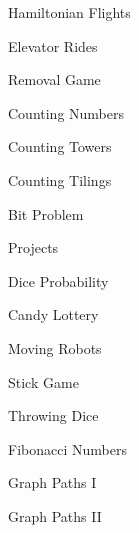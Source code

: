 \begin{practice}
\begin{pplist}
  \item Hamiltonian Flights
  \item Elevator Rides
  \item Removal Game
  \item Counting Numbers
  \item Counting Towers
  \item Counting Tilings
  \item Bit Problem
  \item Projects
\end{pplist}
\begin{pplist}
  \item Dice Probability
  \item Candy Lottery
  \item Moving Robots
  \item Stick Game
  \item Throwing Dice
  \item Fibonacci Numbers
  \item Graph Paths I
  \item Graph Paths II
\end{pplist}
\end{practice}
